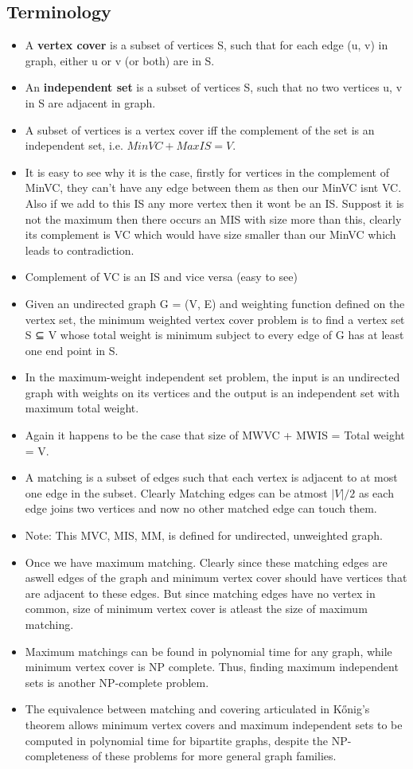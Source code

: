 \documentclass[8pt, a4paper, oneside, twocolumn]{extarticle}
\begin{document}
\subsection{Terminology}
\begin{itemize}
    \item A \textbf{vertex cover} is a subset of vertices S, such that for each edge (u, v) in graph, either u or v (or both) are in S.
    \item An \textbf{independent set} is a subset of vertices S, such that no two vertices u, v in S are adjacent in graph.
    \item A subset of vertices is a vertex cover iff the complement of the set is an independent set, i.e. $MinVC + MaxIS = V$.
    \item It is easy to see why it is the case, firstly for vertices in the complement of MinVC, they can't have any edge between them as then our MinVC isnt VC. Also if we add to this IS any more vertex then it wont be an IS. Suppost it is not the maximum then there occurs an MIS with size more than this, clearly its complement is VC which would have size smaller than our MinVC which leads to contradiction. 
    \item Complement of VC is an IS and vice versa (easy to see)
    \item Given an undirected graph G = (V, E) and weighting function defined on the vertex set, the minimum weighted vertex cover problem is to find a vertex set S ⊆ V whose total weight is minimum subject to every edge of G has at least one end point in S. 
    \item In the maximum-weight independent set problem, the input is an undirected graph with weights on its vertices and the output is an independent set with maximum total weight.
    \item Again it happens to be the case that size of MWVC + MWIS = Total weight = V.
    \item A matching is a subset of edges such that each vertex is adjacent to at most one edge in the subset. Clearly Matching edges can be atmost $|V|/2$ as each edge joins two vertices and now no other matched edge can touch them.
    \item Note: This MVC, MIS, MM, is defined for undirected, unweighted graph.
    \item Once we have maximum matching. Clearly since these matching edges are aswell edges of the graph and minimum vertex cover should have vertices that are adjacent to these edges. But since matching edges have no vertex in common, size of minimum vertex cover is atleast the size of maximum matching.
    \item Maximum matchings can be found in polynomial time for any graph, while minimum vertex cover is NP complete. Thus, finding maximum independent sets is another NP-complete problem.
    \item The equivalence between matching and covering articulated in Kőnig's theorem allows minimum vertex covers and maximum independent sets to be computed in polynomial time for bipartite graphs, despite the NP-completeness of these problems for more general graph families.
\end{itemize}
\end{document}
